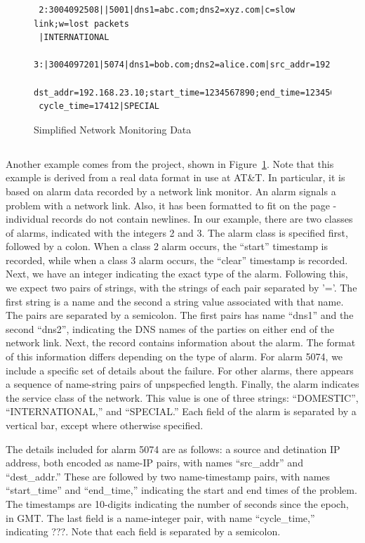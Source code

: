 \documentclass{entcs}
\begin{document}
\begin{figure}
  \centering
  \small
\begin{verbatim}
 2:3004092508||5001|dns1=abc.com;dns2=xyz.com|c=slow link;w=lost packets
 |INTERNATIONAL
 3:|3004097201|5074|dns1=bob.com;dns2=alice.com|src_addr=192.168.0.10;
 dst_addr=192.168.23.10;start_time=1234567890;end_time=1234568000;
 cycle_time=17412|SPECIAL
\end{verbatim}  
  \caption{Simplified Network Monitoring Data}
  \label{fig:darkstar-records}
\end{figure}

\subsection{\darkstar{}}

Another example comes from the \darkstar{} project, shown in
Figure~\ref{fig:darkstar-records}. Note that this example is derived
from a real data format in use at AT\&T. In particular, it is based on
alarm data recorded by a network link monitor. An alarm signals a
problem with a network link. Also, it has been formatted to fit on the
page - individual records do not contain newlines. In our example,
there are two classes of alarms, indicated with the integers 2 and 3.
The alarm class is specified first, followed by a colon. When a class
2 alarm occurs, the ``start'' timestamp is recorded, while when a
class 3 alarm occurs, the ``clear'' timestamp is recorded.  Next, we
have an integer indicating the exact type of the alarm.  Following
this, we expect two pairs of strings, with the strings of each pair
separated by '='. The first string is a name and the second a string
value associated with that name. The pairs are separated by a
semicolon.  The first pairs has name ``dns1'' and the second ``dns2'',
indicating the DNS names of the parties on either end of the network
link. Next, the record contains information about the alarm. The
format of this information differs depending on the type of alarm. For
alarm 5074, we include a specific set of details about the failure.
For other alarms, there appears a sequence of name-string pairs of
unpspecfied length.  Finally, the alarm indicates the service class of
the network. This value is one of three strings: ``DOMESTIC'',
``INTERNATIONAL,'' and ``SPECIAL.'' Each field of the alarm is
separated by a vertical bar, except where otherwise specified.

The details included for alarm 5074 are as follows: a source and
detination IP address, both encoded as name-IP pairs, with names
``src\_addr'' and ``dest\_addr.'' These are followed by two
name-timestamp pairs, with names ``start\_time'' and ``end\_time,''
indicating the start and end times of the problem. The timestamps are
10-digits indicating the number of seconds since the epoch, in
GMT. The last field is a name-integer pair, with name ``cycle\_time,''
indicating ???. Note that each field is separated by a semicolon.
\end{document}
